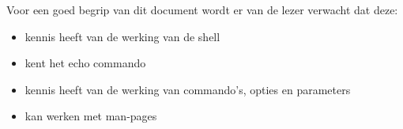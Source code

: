 Voor een goed begrip van dit document wordt er van de lezer verwacht dat deze:
\begin{itemize}
\item kennis heeft van de werking van de shell
\item kent het echo commando
\item kennis heeft van de werking van commando's, opties en parameters
\item kan werken met man-pages
\end{itemize}
